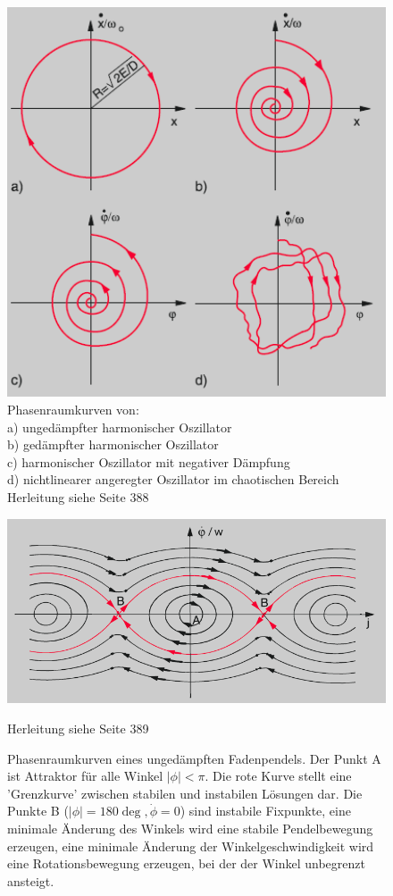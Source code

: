 \begin{figure}
\includegraphics[width=1.0\textwidth]{images/phasenraum1.png}
\caption{Phasenraumkurven von: \\a) ungedämpfter harmonischer Oszillator \\b) gedämpfter harmonischer Oszillator \\c) harmonischer Oszillator mit negativer Dämpfung \\d) nichtlinearer angeregter Oszillator im chaotischen Bereich \\Herleitung siehe \cite{troeder} Seite 388}
\end{figure}

\begin{figure}
\includegraphics[width=1.0\textwidth]{images/phasenraum2.png}
\caption{Phasenraumkurven eines ungedämpften Fadenpendels. Der Punkt A ist Attraktor für alle Winkel $|\phi|<\pi$. Die rote Kurve stellt eine 'Grenzkurve' zwischen stabilen und instabilen Lösungen dar. Die Punkte B ($|\phi|=180\deg, \dot{\phi}=0$) sind instabile Fixpunkte, eine minimale Änderung des Winkels wird eine stabile Pendelbewegung erzeugen, eine minimale Änderung der Winkelgeschwindigkeit wird eine Rotationsbewegung erzeugen, bei der der Winkel unbegrenzt ansteigt.}
Herleitung siehe \cite{troeder} Seite 389
\end{figure}
